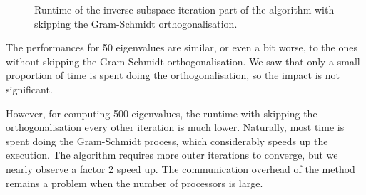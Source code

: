 \begin{figure}[H]
  \centering
  
  \caption{Runtime of the inverse subspace iteration part of the algorithm with skipping the Gram-Schmidt orthogonalisation.}
\end{figure}

The performances for 50 eigenvalues are similar, or even a bit worse, to the ones without skipping the Gram-Schmidt orthogonalisation.
We saw that only a small proportion of time is spent doing the orthogonalisation, so the impact is not significant.

However, for computing 500 eigenvalues, the runtime with skipping the orthogonalisation every other iteration is much lower. 
Naturally, most time is spent doing the Gram-Schmidt process, which considerably speeds up the execution.
The algorithm requires more outer iterations to converge, but we nearly observe a factor 2 speed up.
The communication overhead of the method remains a problem when the number of processors is large.
